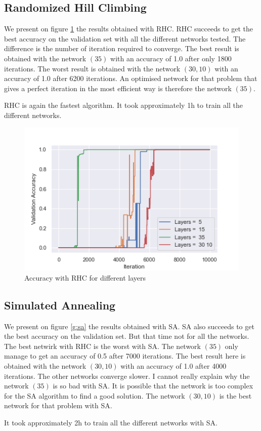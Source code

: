 \documentclass[10pt]{article}
\begin{document}
		\subsection{Randomized Hill Climbing}
			We present on figure \ref{g:rhc} the results obtained with RHC. RHC succeeds to get the best accuracy on the validation set with all the different networks tested. The difference is the number of iteration required to converge. The best result is obtained with the network $(35)$ with an accuracy of 1.0 after only 1800 iterations. The worst result is obtained with the network $(30, 10)$ with an accuracy of 1.0 after 6200 iterations. An optimised network for that problem that gives a perfect iteration in the most efficient way is therefore the network $(35)$.

			RHC is again the fastest algorithm. It took approximately 1h to train all the different networks.

			\begin{figure}[h]
				\centering
				\includegraphics[width=0.45\linewidth]{../graphics/g_RHC_Iteration_Test_Error_Layers.png}
				\caption{Accuracy with RHC for different layers}
				\label{g:rhc}
			\end{figure}
		\subsection{Simulated Annealing}
			We present on figure \ref{g:sa} the results obtained with SA. SA also succeeds to get the best accuracy on the validation set. But that time not for all the networks. The best netwirk with RHC is the worst with SA. The network $(35)$ only manage to get an accuracy of 0.5 after 7000 iterations. The best result here is obtained with the network $(30, 10)$ with an accuracy of 1.0 after 4000 iterations. The other networks converge slower. I cannot really explain why the network $(35)$ is so bad with SA. It is possible that the network is too complex for the SA algorithm to find a good solution. The network $(30, 10)$ is the best network for that problem with SA.

			It took approximately 2h to train all the different networks with SA.
\end{document}
